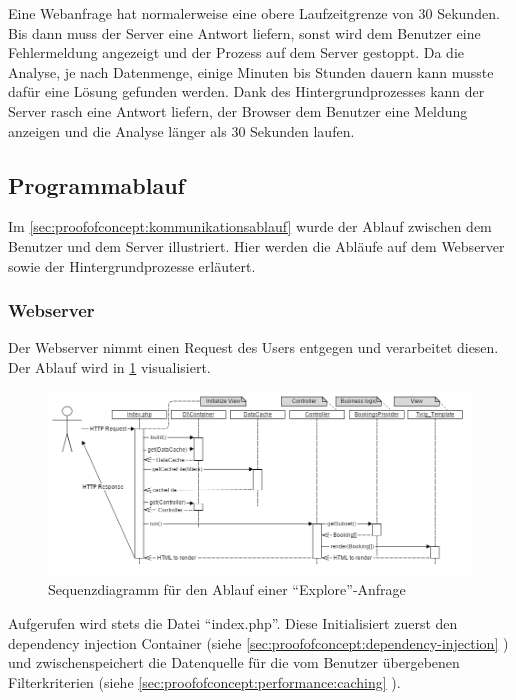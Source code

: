 Eine Webanfrage hat normalerweise eine obere Laufzeitgrenze von 30 Sekunden. Bis dann muss der Server eine Antwort liefern, sonst wird dem Benutzer eine Fehlermeldung angezeigt und der Prozess auf dem Server gestoppt. Da die Analyse, je nach Datenmenge, einige Minuten bis Stunden dauern kann musste dafür eine Lösung gefunden werden. Dank des Hintergrundprozesses kann der Server rasch eine Antwort liefern, der Browser dem Benutzer eine Meldung anzeigen und die Analyse länger als 30 Sekunden laufen.

\subsection{Programmablauf}
Im \cref{sec:proofofconcept:kommunikationsablauf} wurde der Ablauf zwischen dem Benutzer und dem Server illustriert. Hier werden die Abläufe auf dem Webserver sowie der Hintergrundprozesse erläutert.

\subsubsection{Webserver}
\label{sec:proofofconcept:architektur:webserver}
Der Webserver nimmt einen Request des Users entgegen und verarbeitet diesen. Der Ablauf wird in \cref{fig:proofofconcept:architektur:webserver:1} visualisiert.

\begin{figure}[H]
	\centering
	\includegraphics[width=1\textwidth]{images/diagram-sequence-controllers}
	\caption{Sequenzdiagramm für den Ablauf einer "`Explore"'-Anfrage}
	\label{fig:proofofconcept:architektur:webserver:1}
\end{figure}

Aufgerufen wird stets die Datei "`index.php"'. Diese Initialisiert zuerst den dependency injection Container (siehe \cref{sec:proofofconcept:dependency-injection} ) und zwischenspeichert die Datenquelle für die vom Benutzer übergebenen Filterkriterien (siehe \cref{sec:proofofconcept:performance:caching} ).

